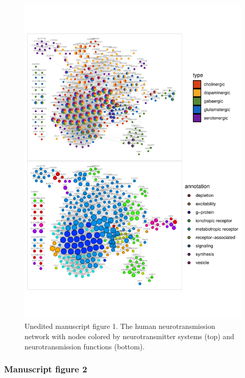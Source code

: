 \begin{Shaded}
\begin{Highlighting}[]
\OperatorTok{/}\StringTok{ }
\end{Highlighting}
\end{Shaded}

\begin{figure}

{\centering \includegraphics{figs/analysis.network.fig1-1} 

}

\caption{Unedited manuscript figure 1. The human neurotransmission network with nodes colored by neurotransmitter systems (top) and neurotransmission functions (bottom).}\label{fig:fig1}
\end{figure}

\hypertarget{manuscript-figure-2}{%
\subsubsection{Manuscript figure 2}\label{manuscript-figure-2}}

